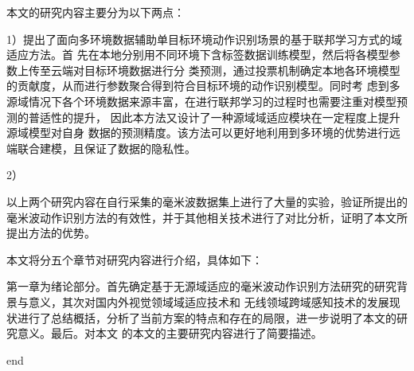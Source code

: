 本文的研究内容主要分为以下两点：

1）提出了面向多环境数据辅助单目标环境动作识别场景的基于联邦学习方式的域适应方法。首
先在本地分别用不同环境下含标签数据训练模型，然后将各模型参数上传至云端对目标环境数据进行分
类预测，通过投票机制确定本地各环境模型的贡献度，从而进行参数聚合得到符合目标环境的动作识别模型。同时考
虑到多源域情况下各个环境数据来源丰富，在进行联邦学习的过程时也需要注重对模型预测的普适性的提升，
因此本方法又设计了一种源域域适应模块在一定程度上提升源域模型对自身
数据的预测精度。该方法可以更好地利用到多环境的优势进行远端联合建模，且保证了数据的隐私性。

2）

以上两个研究内容在自行采集的毫米波数据集上进行了大量的实验，验证所提出的毫米波动作识别方法的有效性，并于其他相关技术进行了对比分析，证明了本文所提出方法的优势。


本文将分五个章节对研究内容进行介绍，具体如下：

第一章为绪论部分。首先确定基于无源域适应的毫米波动作识别方法研究的研究背景与意义，其次对国内外视觉领域域适应技术和
无线领域跨域感知技术的发展现状进行了总结概括，分析了当前方案的特点和存在的局限，进一步说明了本文的研究意义。最后。对本文
的本文的主要研究内容进行了简要描述。

end
